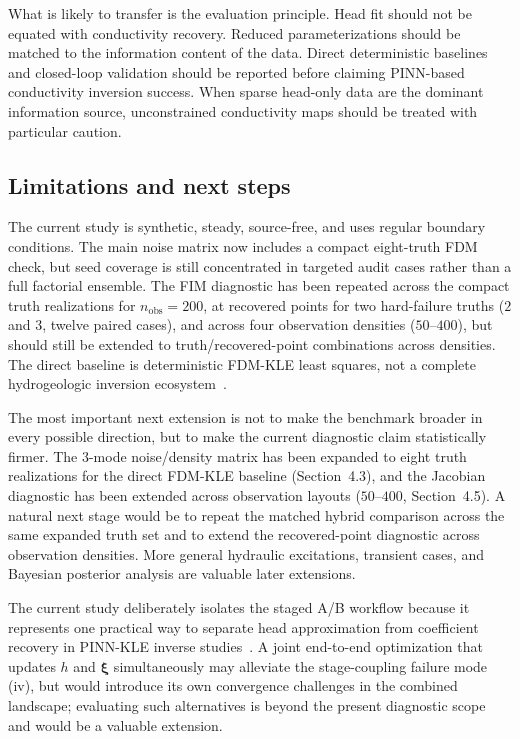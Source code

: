 \documentclass[pdflatex,sn-mathphys,Numbered,iicol]{sn-jnl}
\newcommand{\bxi}{\boldsymbol{\xi}}
\newcommand{\nobs}{n_{\mathrm{obs}}}
\begin{document}
What is likely to transfer is the evaluation principle. Head fit should not be
equated with conductivity recovery. Reduced parameterizations should be matched
to the information content of the data. Direct deterministic baselines and
closed-loop validation should be reported before claiming PINN-based
conductivity inversion success. When sparse head-only data are the dominant
information source, unconstrained conductivity maps should be treated with
particular caution.

\subsection{Limitations and next steps}
\label{sec:disc-limit}

The current study is synthetic, steady, source-free, and uses regular boundary
conditions. The main noise matrix now includes a compact eight-truth FDM check, but
seed coverage is still concentrated in targeted audit cases rather than a full
factorial ensemble. The FIM diagnostic has been repeated across the compact
truth realizations for $\nobs=200$, at recovered points for two hard-failure
truths ($2$ and $3$, twelve paired cases), and across four observation
densities ($50$--$400$), but should still be extended to
truth/recovered-point combinations across densities.
The direct baseline is deterministic FDM-KLE least squares, not a complete
hydrogeologic inversion ecosystem~\cite{doherty2015pest, hill2007effective}.

The most important next extension is not to make the benchmark broader in
every possible direction, but to make the current diagnostic claim
statistically firmer. The 3-mode noise/density matrix has been expanded to eight
truth realizations for the direct FDM-KLE baseline (Section~4.3), and the
Jacobian diagnostic has been extended across observation layouts ($50$--$400$,
Section~4.5). A natural next stage would be to repeat the matched hybrid
comparison across the same expanded truth set and to extend the
recovered-point diagnostic across observation densities. More general hydraulic excitations, transient cases, and
Bayesian posterior analysis are valuable later extensions.

The current study deliberately isolates the staged A/B workflow because it
represents one practical way to separate head approximation from coefficient
recovery in PINN-KLE inverse studies~\cite{tartakovsky2020subsurface,
guo2023htpinn}. A joint end-to-end optimization that updates $h$ and $\bxi$
simultaneously may alleviate the stage-coupling failure mode (iv), but would
introduce its own convergence challenges in the combined landscape; evaluating
such alternatives is beyond the present diagnostic scope and would be a
valuable extension.
\end{document}
